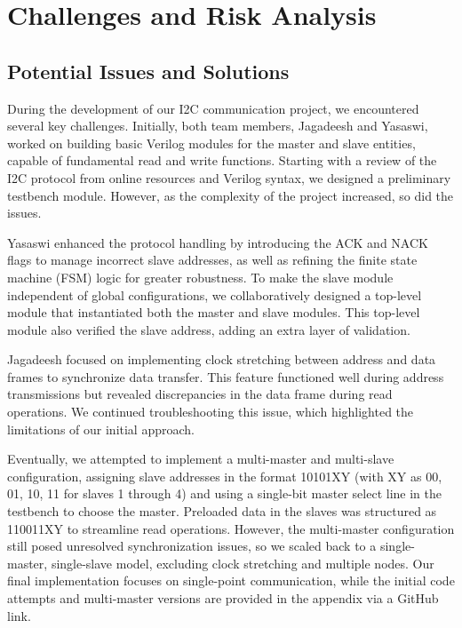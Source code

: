 \documentclass[a4paper,12pt]{report}
\begin{document}
\chapter{Challenges and Risk Analysis}

\section{Potential Issues and Solutions}
During the development of our I2C communication project, we encountered several key challenges. Initially, both team members, Jagadeesh and Yasaswi, worked on building basic Verilog modules for the master and slave entities, capable of fundamental read and write functions. Starting with a review of the I2C protocol from online resources and Verilog syntax, we designed a preliminary testbench module. However, as the complexity of the project increased, so did the issues.

\vspace{0.5in}

Yasaswi enhanced the protocol handling by introducing the ACK and NACK flags to manage incorrect slave addresses, as well as refining the finite state machine (FSM) logic for greater robustness. To make the slave module independent of global configurations, we collaboratively designed a top-level module that instantiated both the master and slave modules. This top-level module also verified the slave address, adding an extra layer of validation.

\vspace{0.5in}

Jagadeesh focused on implementing clock stretching between address and data frames to synchronize data transfer. This feature functioned well during address transmissions but revealed discrepancies in the data frame during read operations. We continued troubleshooting this issue, which highlighted the limitations of our initial approach.

\vspace{0.5in}

Eventually, we attempted to implement a multi-master and multi-slave configuration, assigning slave addresses in the format 10101XY (with XY as 00, 01, 10, 11 for slaves 1 through 4) and using a single-bit master select line in the testbench to choose the master. Preloaded data in the slaves was structured as 110011XY to streamline read operations. However, the multi-master configuration still posed unresolved synchronization issues, so we scaled back to a single-master, single-slave model, excluding clock stretching and multiple nodes. Our final implementation focuses on single-point communication, while the initial code attempts and multi-master versions are provided in the appendix via a GitHub link.
\newpage
\end{document}
